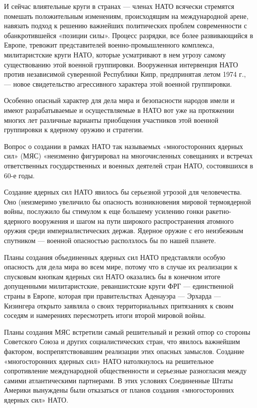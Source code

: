 \documentclass[12pt, a4paper, openany]{book}
\begin{document}
И сейчас влиятельные круги в странах — членах НАТО всячески стремятся помешать положительным изменениям, происходящим на международной арене, навязать подход к решению важнейших политических проблем современности с обанкротившейся «позиции силы». Процесс разрядки, все более развивающийся в Европе, тревожит представителей военно-промышленного комплекса, милитаристские круги НАТО, которые усматривают в нем угрозу самому существованию этой военной группировки. Вооруженная интервенция НАТО против независимой суверенной Республики Кипр, предпринятая летом 1974 г., — новое свидетельство агрессивного характера этой военной группировки.

Особенно опасный характер для дела мира и безопасности народов имели и имеют разрабатываемые и осуществляемые в НАТО вот уже на протяжении многих лет различные варианты приобщения участников этой военной группировки к ядерному оружию и стратегии.

Вопрос о создании в рамках НАТО так называемых «многосторонних ядерных сил» (МЯС) «неизменно фигурировал на многочисленных совещаниях и встречах ответственных государственных и военных деятелей стран НАТО, состоявшихся в 60-е годы.

Создание ядерных сил НАТО явилось бы серьезной угрозой для человечества. Оно (неизмеримо увеличило бы опасность возникновения мировой термоядерной войны, послужило бы стимулом к еще большему усилению гонки ракетно-ядерного вооружения и шагом на пути широкого распространения атомного оружия среди империалистических держав. Ядерное оружие с его неизбежным спутником — военной опасностью расползлось бы по нашей планете.

Планы создания объединенных ядерных сил НАТО представляли особую опасность для дела мира во всем мире, потому что в случае их реализации к спусковым кнопкам ядерных сил НАТО оказались бы в конечном итоге допущенными милитаристские, реваншистские круги ФРГ — единственной страны в Европе, которая при правительствах Аденауэра — Эрхарда — Кизингера открыто заявляла о своих территориальных притязаниях к своим соседям и намерениях пересмотреть итоги второй мировой войны.

Планы создания МЯС встретили самый решительный и резкий отпор со стороны Советского Союза и других социалистических стран, что явилось важнейшим фактором, воспрепятствовавшим реализации этих опасных замыслов. Создание «многосторонних ядерных сил» НАТО натолкнулось на решительное сопротивление международной общественности и серьезные разногласия между самими атлантическими партнерами. В этих условиях Соединенные Штаты Америки вынуждены были отказаться от планов создания «многосторонних ядерных сил» НАТО.
\end{document}
